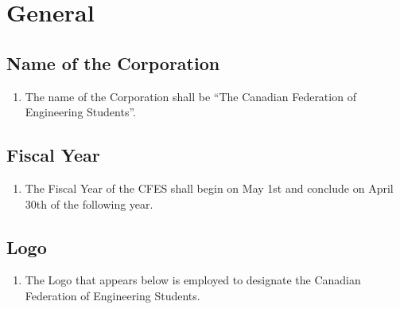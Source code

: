 \section{General}
\label{general}

\subsection{Name of the Corporation}
\label{general-name-of-the-corporation}

\begin{enumerate}
 \item The name of the Corporation shall be “The Canadian Federation of Engineering Students”.
\end{enumerate}

\subsection{Fiscal Year}
\label{general-fiscal-year}

\begin{enumerate}
 \item The Fiscal Year of the CFES shall begin on May 1st and conclude on April 30th of the following year.
\end{enumerate}

\subsection{Logo}
\label{general-logo}

\begin{enumerate}
 \item The Logo that appears below is employed to designate the Canadian Federation of Engineering Students.
\end{enumerate}
